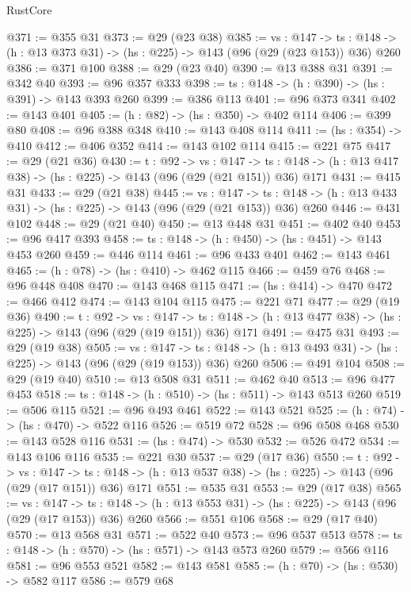 \begin{lexlean}{RustCore}
\begin{coremodule}
@371 := @355 @31
@373 := @29 (@23 @38)
@385 := {vs : @147} ->
  {ts : @148} -> (h : @13 @373 @31) -> (hs : @225) -> @143 (@96 (@29 (@23 @153)) @36) @260
@386 := @371 @100
@388 := @29 (@23 @40)
@390 := @13 @388 @31
@391 := @342 @40
@393 := @96 @357 @333
@398 := {ts : @148} -> (h : @390) -> (hs : @391) -> @143 @393 @260
@399 := @386 @113
@401 := @96 @373 @341
@402 := @143 @401
@405 := (h : @82) -> (hs : @350) -> @402 @114
@406 := @399 @80
@408 := @96 @388 @348
@410 := @143 @408 @114
@411 := (hs : @354) -> @410
@412 := @406 @352
@414 := @143 @102 @114
@415 := @221 @75
@417 := @29 (@21 @36)
@430 := {t : @92} ->
  {vs : @147} ->
  {ts : @148} -> (h : @13 @417 @38) -> (hs : @225) -> @143 (@96 (@29 (@21 @151)) @36) @171
@431 := @415 @31
@433 := @29 (@21 @38)
@445 := {vs : @147} ->
  {ts : @148} -> (h : @13 @433 @31) -> (hs : @225) -> @143 (@96 (@29 (@21 @153)) @36) @260
@446 := @431 @102
@448 := @29 (@21 @40)
@450 := @13 @448 @31
@451 := @402 @40
@453 := @96 @417 @393
@458 := {ts : @148} -> (h : @450) -> (hs : @451) -> @143 @453 @260
@459 := @446 @114
@461 := @96 @433 @401
@462 := @143 @461
@465 := (h : @78) -> (hs : @410) -> @462 @115
@466 := @459 @76
@468 := @96 @448 @408
@470 := @143 @468 @115
@471 := (hs : @414) -> @470
@472 := @466 @412
@474 := @143 @104 @115
@475 := @221 @71
@477 := @29 (@19 @36)
@490 := {t : @92} ->
  {vs : @147} ->
  {ts : @148} -> (h : @13 @477 @38) -> (hs : @225) -> @143 (@96 (@29 (@19 @151)) @36) @171
@491 := @475 @31
@493 := @29 (@19 @38)
@505 := {vs : @147} ->
  {ts : @148} -> (h : @13 @493 @31) -> (hs : @225) -> @143 (@96 (@29 (@19 @153)) @36) @260
@506 := @491 @104
@508 := @29 (@19 @40)
@510 := @13 @508 @31
@511 := @462 @40
@513 := @96 @477 @453
@518 := {ts : @148} -> (h : @510) -> (hs : @511) -> @143 @513 @260
@519 := @506 @115
@521 := @96 @493 @461
@522 := @143 @521
@525 := (h : @74) -> (hs : @470) -> @522 @116
@526 := @519 @72
@528 := @96 @508 @468
@530 := @143 @528 @116
@531 := (hs : @474) -> @530
@532 := @526 @472
@534 := @143 @106 @116
@535 := @221 @30
@537 := @29 (@17 @36)
@550 := {t : @92} ->
  {vs : @147} ->
  {ts : @148} -> (h : @13 @537 @38) -> (hs : @225) -> @143 (@96 (@29 (@17 @151)) @36) @171
@551 := @535 @31
@553 := @29 (@17 @38)
@565 := {vs : @147} ->
  {ts : @148} -> (h : @13 @553 @31) -> (hs : @225) -> @143 (@96 (@29 (@17 @153)) @36) @260
@566 := @551 @106
@568 := @29 (@17 @40)
@570 := @13 @568 @31
@571 := @522 @40
@573 := @96 @537 @513
@578 := {ts : @148} -> (h : @570) -> (hs : @571) -> @143 @573 @260
@579 := @566 @116
@581 := @96 @553 @521
@582 := @143 @581
@585 := (h : @70) -> (hs : @530) -> @582 @117
@586 := @579 @68

\end{coremodule}
\end{lexlean}
